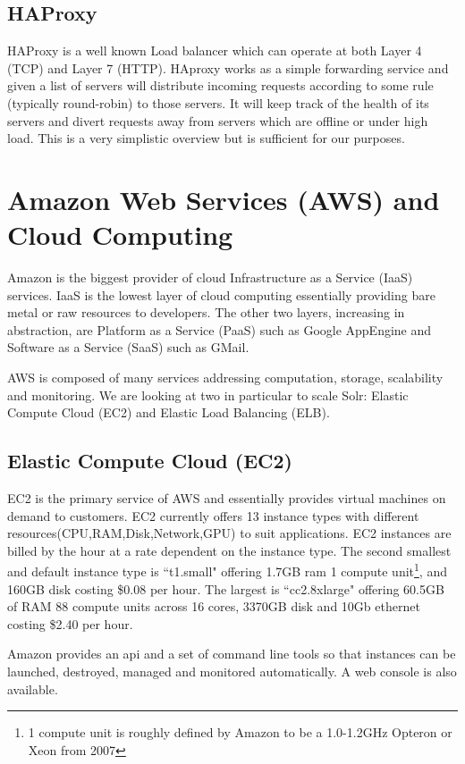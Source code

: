 \documentclass{article}
\begin{document}
\subsection{HAProxy}
HAProxy is a well known Load balancer which can operate at both Layer
4 (TCP) and Layer 7 (HTTP). HAproxy works as a simple forwarding
service and given a list of servers will distribute incoming requests
according to some rule (typically round-robin) to those servers. It
will keep track of the health of its servers and divert requests away
from servers which are offline or under high load. This is a very
simplistic overview but is sufficient for our purposes.

\section{Amazon Web Services (AWS) and Cloud Computing}
Amazon is the biggest provider of cloud Infrastructure as a Service
(IaaS) services. IaaS is the lowest layer of cloud computing
essentially providing bare metal or raw resources to developers. The
other two layers, increasing in abstraction, are Platform as a Service
(PaaS) such as Google AppEngine and Software as a Service (SaaS) such
as GMail.

AWS is composed of many services addressing computation, storage,
scalability and monitoring. We are looking at two in particular to
scale Solr: Elastic Compute Cloud (EC2) and Elastic Load Balancing
(ELB).

\subsection{Elastic Compute Cloud (EC2)}
EC2 is the primary service of AWS and essentially provides virtual
machines on demand to customers. EC2 currently offers 13 instance
types with different resources(CPU,RAM,Disk,Network,GPU) to suit
applications. EC2 instances are billed by the hour at a rate dependent
on the instance type. The second smallest and default instance type is
``t1.small" offering 1.7GB ram 1 compute unit\footnote{1 compute unit
  is roughly defined by Amazon to be a 1.0-1.2GHz Opteron or Xeon from 2007},
and 160GB disk costing \$0.08 per hour. The largest is ``cc2.8xlarge"
offering 60.5GB of RAM 88 compute units across 16 cores, 3370GB disk
and 10Gb ethernet costing \$2.40 per hour.

Amazon provides an api and a set of command line tools so that instances
can be launched, destroyed, managed and monitored automatically. A web console is
also available.
\end{document}
